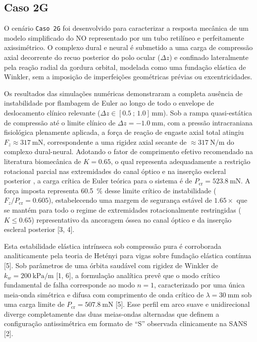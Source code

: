 \documentclass[12pt,a4paper]{article}
\begin{document}
\subsection*{Caso 2G}
\label{sec:res-caso2}

O cenário \texttt{Caso 2G} foi desenvolvido para caracterizar a resposta mecânica de um modelo simplificado do NO representado por um tubo retilíneo e perfeitamente axissimétrico. O complexo dural e neural é submetido a uma carga de compressão axial decorrente do recuo posterior do polo ocular ($\Delta z$) e confinado lateralmente pela reação radial da gordura orbital, modelada como uma fundação elástica de Winkler, sem a imposição de imperfeições geométricas prévias ou excentricidades.

Os resultados das simulações numéricas demonstraram a completa ausência de instabilidade por flambagem de Euler ao longo de todo o envelope de deslocamento clínico relevante ($\Delta z \in [\SI{0.5}{};\,\SI{1.0}]\,\si{\milli\meter}$). Sob a rampa quasi-estática de compressão até o limite clínico de $\Delta z = -\SI{1.0}{\milli\meter}$, com a pressão intracraniana fisiológica plenamente aplicada, a força de reação de engaste axial total atingiu $F_z \approx \SI{317}{\milli\newton}$, correspondente a uma rigidez axial secante de $\approx \SI{317}{\newton\per\meter}$ do complexo dural-neural. Adotando o fator de comprimento efetivo recomendado na literatura biomecânica de $K = 0.65$, o qual representa adequadamente a restrição rotacional parcial nas extremidades do canal óptico e na inserção escleral posterior \cite{wang2016}, a carga crítica de Euler teórica para o sistema é de $P_{\mathrm{cr}} = \SI{523.8}{\milli\newton}$. A força imposta representa \SI{60.5}{\%} desse limite crítico de instabilidade ($F_z/P_{\mathrm{cr}} = 0.605$), estabelecendo uma margem de segurança estável de $1.65\times$ que se mantém para todo o regime de extremidades rotacionalmente restringidas ($K \le 0.65$) representativo da ancoragem óssea no canal óptico e da inserção escleral posterior [3, 4].

Esta estabilidade elástica intrínseca sob compressão pura é corroborada analiticamente pela teoria de Hetényi para vigas sobre fundação elástica contínua \cite{reilly2023} [5]. Sob parâmetros de uma órbita saudável com rigidez de Winkler de $k_w = \SI{200}{\kilo\pascal\per\meter}$ [1, 6], a formulação analítica prevê que o modo crítico fundamental de falha corresponde ao modo $n = 1$, caracterizado por uma única meia-onda simétrica e difusa com comprimento de onda crítico de $\lambda = \SI{30}{\milli\meter}$ sob uma carga limite de $P_{\mathrm{cr}} = \SI{507.8}{\milli\newton}$ [5]. Esse perfil em arco suave e unidirecional diverge completamente das duas meias-ondas alternadas que definem a configuração antissimétrica em formato de ``S'' observada clinicamente na SANS \cite{lee2020} [2].
\end{document}
